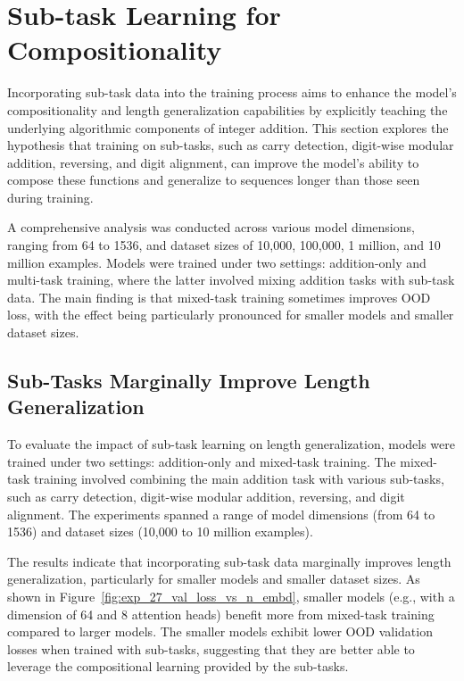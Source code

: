 \section{Sub-task Learning for Compositionality}\label{sec:subtask_learning}

Incorporating sub-task data into the training process aims to enhance the model's compositionality and length generalization capabilities by explicitly teaching the underlying algorithmic components of integer addition. This section explores the hypothesis that training on sub-tasks, such as carry detection, digit-wise modular addition, reversing, and digit alignment, can improve the model's ability to compose these functions and generalize to sequences longer than those seen during training.

A comprehensive analysis was conducted across various model dimensions, ranging from 64 to 1536, and dataset sizes of 10,000, 100,000, 1 million, and 10 million examples. Models were trained under two settings: addition-only and multi-task training, where the latter involved mixing addition tasks with sub-task data. The main finding is that mixed-task training sometimes improves OOD loss, with the effect being particularly pronounced for smaller models and smaller dataset sizes.

\subsection{Sub-Tasks Marginally Improve Length Generalization}

To evaluate the impact of sub-task learning on length generalization, models were trained under two settings: addition-only and mixed-task training. The mixed-task training involved combining the main addition task with various sub-tasks, such as carry detection, digit-wise modular addition, reversing, and digit alignment. The experiments spanned a range of model dimensions (from 64 to 1536) and dataset sizes (10,000 to 10 million examples).

The results indicate that incorporating sub-task data marginally improves length generalization, particularly for smaller models and smaller dataset sizes. As shown in Figure~\ref{fig:exp_27_val_loss_vs_n_embd}, smaller models (e.g., with a dimension of 64 and 8 attention heads) benefit more from mixed-task training compared to larger models. The smaller models exhibit lower OOD validation losses when trained with sub-tasks, suggesting that they are better able to leverage the compositional learning provided by the sub-tasks.

